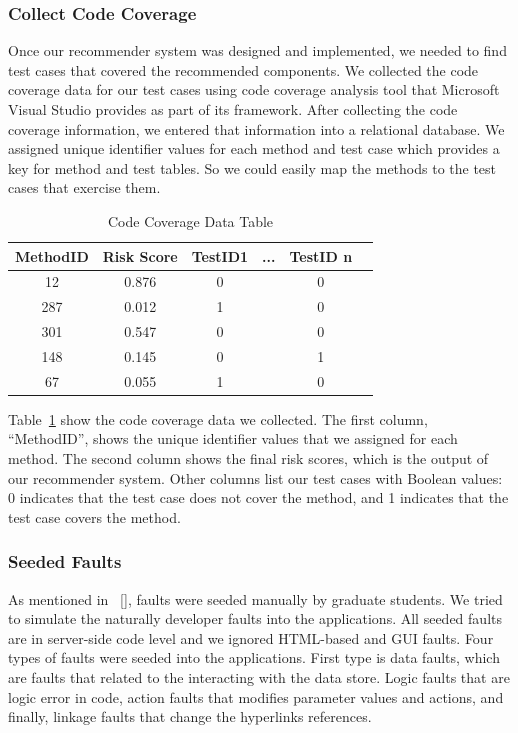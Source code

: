 \subsubsection{Collect Code Coverage}
\label{codecoverage}
Once our recommender system was designed and implemented, 
we needed to find test cases that covered the recommended components. 
We collected the code coverage data for our test cases using code coverage analysis tool  
that Microsoft Visual Studio provides as part of its framework. 
After collecting the code coverage information, 
we entered that information into a relational database. We assigned unique
identifier values for each method and test case which provides
a key for method and test tables. So we could easily map the methods
to the test cases that exercise them.  

 
\begin{table}[!ht]
\caption{Code Coverage Data Table}
\begin{center}
\begin{tabular}{|c|c|c|c|c|c|} \hline
	MethodID  & Risk Score & TestID1 & ... & TestID n \\\hline
	12 & 0.876 & 0 &  & 0 \\\hline
	287 & 0.012 & 1 &  & 0 \\\hline
	301 & 0.547 & 0 &  & 0 \\\hline
	148 & 0.145 & 0 &  & 1 \\\hline
	67 & 0.055 & 1 &  & 0 \\\hline			
\end{tabular}
\end {center}
\label{tab:coverage}
\end{table}

	
Table~\ref{tab:coverage} show the code coverage data we collected.
The first column, ``MethodID'', shows
the unique identifier values that we assigned for each method. 
The second column shows the final risk scores, which is the output of 
our recommender system. Other columns list our test cases
with Boolean values: 0 indicates that the test case does not cover 
the method, and 1 indicates that the test case covers the method.

\subsubsection{Seeded Faults}
\label{faultsInfo}
As mentioned in ~\ref{}, faults were seeded manually by graduate students. 
We tried to simulate the naturally developer faults into the applications. 
All seeded faults are in server-side code level and we ignored HTML-based and GUI faults. 
Four types of faults were seeded into the applications. 
First type is data faults, which are faults that related to the interacting with the data store. 
Logic faults that are logic error in code, action faults that modifies parameter values and actions, 
and finally, linkage faults that change the hyperlinks references.  



